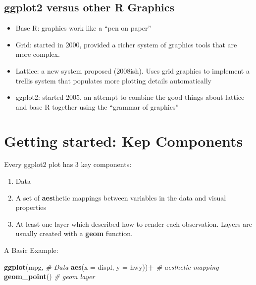 \documentclass[
]{book}
\newenvironment{Shaded}{\begin{snugshade}}{\end{snugshade}}
\newcommand{\CommentTok}[1]{\textcolor[rgb]{0.56,0.35,0.01}{\textit{#1}}}
\newcommand{\DataTypeTok}[1]{\textcolor[rgb]{0.13,0.29,0.53}{#1}}
\newcommand{\KeywordTok}[1]{\textcolor[rgb]{0.13,0.29,0.53}{\textbf{#1}}}
\newcommand{\NormalTok}[1]{#1}
\newcommand{\OperatorTok}[1]{\textcolor[rgb]{0.81,0.36,0.00}{\textbf{#1}}}
\newcommand{\StringTok}[1]{\textcolor[rgb]{0.31,0.60,0.02}{#1}}
\begin{document}
\hypertarget{ggplot2-versus-other-r-graphics}{%
\subsection*{ggplot2 versus other R Graphics}\label{ggplot2-versus-other-r-graphics}}

\begin{itemize}
\item
  Base R: graphics work like a ``pen on paper''
\item
  Grid: started in 2000, provided a richer system of graphics tools that are more complex.
\item
  Lattice: a new system proposed (2008ish). Uses grid graphics to implement a trellis system that populates more plotting details automatically
\item
  ggplot2: started 2005, an attempt to combine the good things about lattice and base R together using the ``grammar of graphics''
\end{itemize}

\hypertarget{getting-started-kep-components}{%
\section{Getting started: Kep Components}\label{getting-started-kep-components}}

Every ggplot2 plot has 3 key components:

\begin{enumerate}
\def\labelenumi{\arabic{enumi})}
\item
  Data
\item
  A set of \textbf{aes}thetic mappings between variables in the data and visual properties
\item
  At least one layer which described how to render each observation. Layers are usually created with a \textbf{geom} function.
\end{enumerate}

A Basic Example:

\begin{Shaded}
\begin{Highlighting}[]
\KeywordTok{ggplot}\NormalTok{(mpg,                        }\CommentTok{# Data}
       \KeywordTok{aes}\NormalTok{(}\DataTypeTok{x =}\NormalTok{ displ, }\DataTypeTok{y =}\NormalTok{ hwy))}\OperatorTok{+}\StringTok{   }\CommentTok{# aesthetic mapping}
\StringTok{  }\KeywordTok{geom_point}\NormalTok{()                     }\CommentTok{# geom layer }
\end{Highlighting}
\end{Shaded}
\end{document}
